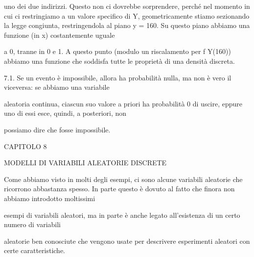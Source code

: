 \documentclass[a4paper,portrait,12pt]{article}
\begin{document}
\begin{flushleft}
uno dei due indirizzi. Questo non ci dovrebbe sorprendere, perch\'{e} nel momento in cui ci restringiamo a un valore specifico di Y, geometricamente stiamo sezionando la legge congiunta, restringendola al piano y = 160. Su questo piano abbiamo una funzione (in x) costantemente uguale
\end{flushleft}


\begin{flushleft}
a 0, tranne in 0 e 1. A questo punto (modulo un riscalamento per f Y(160)) abbiamo una funzione che soddisfa tutte le propriet\`{a} di una densit\`{a} discreta.
\end{flushleft}


\begin{flushleft}
7.1. Se un evento \`{e} impossibile, allora ha probabilit\`{a} nulla, ma non \`{e} vero il viceversa: se abbiamo una variabile
\end{flushleft}


\begin{flushleft}
aleatoria continua, ciascun suo valore a priori ha probabilit\`{a} 0 di uscire, eppure uno di essi esce, quindi, a posteriori, non
\end{flushleft}


\begin{flushleft}
possiamo dire che fosse impossibile.
\end{flushleft}





\begin{flushleft}
\newpage
\newpage
CAPITOLO 8
\end{flushleft}


\begin{flushleft}
MODELLI DI VARIABILI ALEATORIE DISCRETE
\end{flushleft}


\begin{flushleft}
Come abbiamo visto in molti degli esempi, ci sono alcune variabili aleatorie che ricorrono abbastanza spesso. In parte questo \`{e} dovuto al fatto che finora non abbiamo introdotto moltissimi
\end{flushleft}


\begin{flushleft}
esempi di variabili aleatori, ma in parte \`{e} anche legato all'esistenza di un certo numero di variabili
\end{flushleft}


\begin{flushleft}
aleatorie ben conosciute che vengono usate per descrivere esperimenti aleatori con certe caratteristiche.
\end{flushleft}
\end{document}
